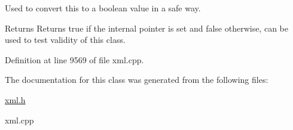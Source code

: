 Used to convert this to a boolean value in a safe way. 

\begin{DoxyReturn}{Returns}
Returns true if the internal pointer is set and false otherwise, can be used to test validity of this class. 
\end{DoxyReturn}


Definition at line 9569 of file xml.cpp.



The documentation for this class was generated from the following files:\begin{DoxyCompactItemize}
\item 
\hyperlink{xml_8h}{xml.h}\item 
xml.cpp\end{DoxyCompactItemize}
